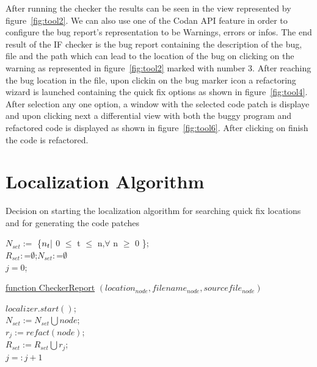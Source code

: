 After running the checker the results can be seen in the view represented
by figure~\ref{fig:tool2}. We can also use one of the Codan API feature in order
to configure the bug report's representation to be Warnings, errors or infos.
The end result of the IF checker is the bug report containing the description
of the bug, file and the path which can lead to the location of the bug on clicking
on the warning as represented in figure~\ref{fig:tool2} marked with number 3.
After reaching the bug location in the file, upon clickin on the bug marker icon
a refactoring wizard is launched containing the quick fix options as shown in 
figure~\ref{fig:tool4}. After selection any one option, a window with the selected
code patch is displaye and upon clicking next a differential view with
both the buggy program and refactored code is displayed as shown in 
figure~\ref{fig:tool6}. After clicking on finish the code is refactored.



\label{chapter:Algorithm}

\chapter{Localization Algorithm}
\label{chapter:Algorithm}
{\LinesNumberedHidden
\begin{algorithm}
\caption{Decision on starting the localization algorithm for searching quick fix locations and for generating the code patches}
\label{alg:one}
\SetAlgoLined
{}


$N_{set}:=$ \{$n_t\arrowvert$ 0 $\leq$ t $\leq$ n,$\forall$ n $\geq$ 0 \};\textcolor{dkgreen}{\textbf{\selectfont{//set of nodes}}}\\
$R_{set}:$=$\emptyset$;$N_{set}:$=$\emptyset$\;\textcolor{dkgreen}{\textbf{\selectfont{//initialising nodes set and refactoring set to empty}}}\\
$j=0$;

\underline{function CheckerReport} $(location_{node}, filename_{node}, sourcefile_{node})$

{
$localizer.start()$;\textcolor{dkgreen}{\textbf{\selectfont{//Starting the localizer}}}\\
}
{
$N_{set}:=N_{set}\bigcup{node}$;\textcolor{dkgreen}{\textbf{\selectfont{//adding node to node set}}}\\
$r_{j}:= refact(node)$;\textcolor{dkgreen}{\textbf{\selectfont{//Refactoring the node}}}\\
$R_{set}:=R_{set}\bigcup{r_{j}}$;\textcolor{dkgreen}{\textbf{\selectfont{//adding refactored node}}}\\
$j=:j+1$\;
}
\end{algorithm}
}

